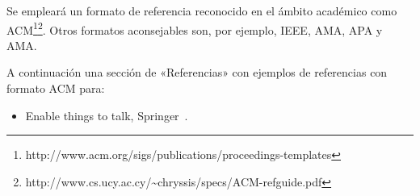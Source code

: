 \documentclass{pre-tfg}
\begin{document}
Se empleará un formato de referencia reconocido en el ámbito académico como
ACM\footnote{http://www.acm.org/sigs/publications/proceedings-templates}\footnote{http://www.cs.ucy.ac.cy/\~{}chryssis/specs/ACM-refguide.pdf}.
Otros formatos aconsejables son, por ejemplo, IEEE, AMA, APA y AMA.

A continuación una sección de «Referencias» con ejemplos de referencias con formato ACM para:

\begin{itemize}
 \item Enable things to talk, Springer~\cite{EIoT2Talk13}.
\end{itemize}



\end{document}
